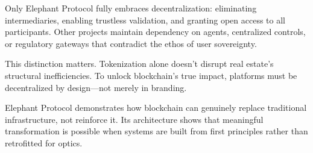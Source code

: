 Only Elephant Protocol fully embraces decentralization: eliminating intermediaries, enabling trustless validation, and granting open access to all participants. Other projects maintain dependency on agents, centralized controls, or regulatory gateways that contradict the ethos of user sovereignty.

This distinction matters. Tokenization alone doesn’t disrupt real estate’s structural inefficiencies. To unlock blockchain’s true impact, platforms must be decentralized by design—not merely in branding.

Elephant Protocol demonstrates how blockchain can genuinely replace traditional infrastructure, not reinforce it. Its architecture shows that meaningful transformation is possible when systems are built from first principles rather than retrofitted for optics.
